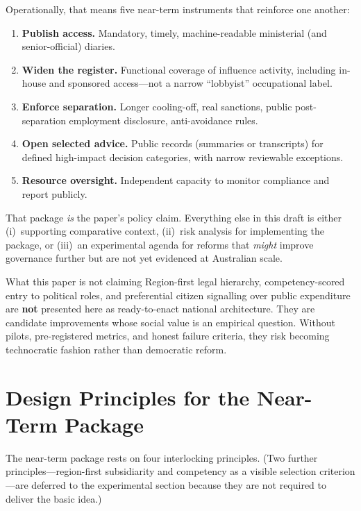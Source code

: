 \documentclass[11pt,a4paper]{article}
\begin{document}
Operationally, that means five near-term instruments that reinforce one another:

\begin{enumerate}[leftmargin=*]
    \item \textbf{Publish access.} Mandatory, timely, machine-readable ministerial (and senior-official) diaries.
    \item \textbf{Widen the register.} Functional coverage of influence activity, including in-house and sponsored access---not a narrow ``lobbyist'' occupational label.
    \item \textbf{Enforce separation.} Longer cooling-off, real sanctions, public post-separation employment disclosure, anti-avoidance rules.
    \item \textbf{Open selected advice.} Public records (summaries or transcripts) for defined high-impact decision categories, with narrow reviewable exceptions.
    \item \textbf{Resource oversight.} Independent capacity to monitor compliance and report publicly.
\end{enumerate}

That package \emph{is} the paper’s policy claim. Everything else in this draft is either (i)~supporting comparative context, (ii)~risk analysis for implementing the package, or (iii)~an experimental agenda for reforms that \emph{might} improve governance further but are not yet evidenced at Australian scale.

\begin{warningbox}{What this paper is not claiming}
Region-first legal hierarchy, competency-scored entry to political roles, and preferential citizen signalling over public expenditure are \textbf{not} presented here as ready-to-enact national architecture. They are candidate improvements whose social value is an empirical question. Without pilots, pre-registered metrics, and honest failure criteria, they risk becoming technocratic fashion rather than democratic reform.
\end{warningbox}

\section{Design Principles for the Near-Term Package}

The near-term package rests on four interlocking principles. (Two further principles---region-first subsidiarity and competency as a visible selection criterion---are deferred to the experimental section because they are not required to deliver the basic idea.)
\end{document}
